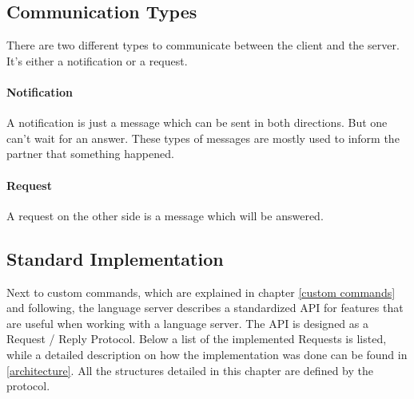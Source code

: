 \subsection{Communication Types}
There are two different types to communicate between the client and the server. It's either a notification or a request. 
\paragraph{Notification}
A notification is just a message which can be sent in both directions. But one can't wait for an answer. These types of messages are mostly used to inform the partner that something happened. 
\paragraph{Request}
A request on the other side is a message which will be answered.  
\subsection{Standard Implementation}
Next to custom commands, which are explained in chapter \ref{custom commands} and following, the language server describes a standardized API \cite{protMaster} for features that are useful when working with a language server. The API is designed as a Request / Reply Protocol. Below a list of the implemented Requests is listed, while a detailed description on how the implementation was done can be found in \ref{architecture}. All the structures detailed in this chapter are defined by the protocol. \newline
